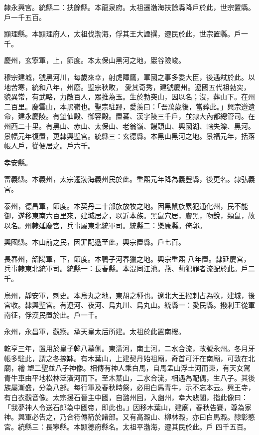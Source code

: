 \begin{pinyinscope}
 隸永興宮。統縣二：扶餘縣。本龍泉府。太祖遷渤海扶餘縣降戶於此，世宗置縣。戶一千五百。



 顯理縣。本顯理府人，太祖伐渤海，俘其王大諲撰，遷民於此，世宗置縣。戶一千。



 慶州，玄寧軍，上，節度。本太保山黑河之地，巖谷險峻。



 穆宗建城，號黑河川，每歲來幸，射虎障鷹，軍國之事多委大臣，後遇弒於此。以地苦寒，統和八年，州廢。聖宗秋畋，
 愛其奇秀，建號慶州。遼國五代祖勃突，貌異常，有武略，力敵百人，眾推為玉。生於勃突山，因以名；沒，葬山下。在州二百里。慶雲山，本黑嶺也。聖宗駐蹕，愛羨曰：「吾萬歲後，當葬此。」興宗遵遺命，建永慶陵。有望仙殿、御容殿。置蕃、漢字陵三千戶，並隸大內都總管司。在州西二十里。有黑山、赤山、太保山、老翁嶺、饅頭山、興國湖、轄失濼、黑河。景幅元年復置，更隸興聖宮。統縣三：玄德縣。本黑山黑河之地。景福元年，括落帳人戶，從便居之。戶六千。



 孝安縣。



 富義縣。本義州，太宗遷渤海義州民於此。重熙元年降為義豐縣，後更名。隸弘義宮。



 泰州，德昌軍，節度。本契丹二十部族放牧之地。因黑鼠族累犯通化州，民不能御，遂移東南六百里來，建城居之，以近本族。黑鼠穴居，膚黑，吻銳，類鼠，故以名。州隸延慶宮，兵事屬東北統軍司。統縣二：樂康縣。倚郭。



 興國縣。本山前之民，因罪配遞至此，興宗置縣。戶七百。



 長春州，韶陽軍，下，節度。本鴨子河春獵之地。興宗重熙
 八年置。隸延慶宮，兵事隸東北統軍司。統縣一：長春縣。本混同江池。燕、薊犯罪者流配於此。戶二千。



 烏州，靜安軍，刺史。本烏丸之地，東胡之種也。遼北大王撥刺占為牧，建城，後宮收。隸興聖宮。有遼河、夜河、烏丸川、烏丸山。統縣一：愛民縣。撥刺王從軍南征，俘漢民置於此。戶一千。



 永州，永昌軍，觀察。承天皇太后所建。太祖於此置南樓。



 乾亨三年，置用於皇子韓八墓側。東潢河，南土河，二水合流，故號永州。冬月牙帳多駐此，謂之冬捺缽。有木葉山，上建契丹始祖廟，奇首可汗在南廟，可敦在北廟，繪
 塑二聖並八子神像。相傳有神人乘白馬，自馬盂山浮土河而東，有天女駕青牛車由平地松林泛潢河而下。至木葉山，二水合流，相遇為配偶，生八子。其後族屬漸盛，分為八部。每行軍及春秋時祭，必用白馬青牛，示不忘本云。興王寺，有白衣觀音像。太宗援石晉主中國，自潞州回，入幽州，幸大悲閣，指此像曰：「我夢神人令送石郎為中國帝，即此也。」因移木葉山，建廟，春秋告賽，尊為家神。興軍必告之，乃合符傳箭於諸部。又有高澱山、柳林澱，亦曰白馬澱。隸彰愍宮。統縣三：長寧縣。本顯德府縣名。太祖平渤海，遷其民於此。戶
 四千五百。




\end{pinyinscope}
